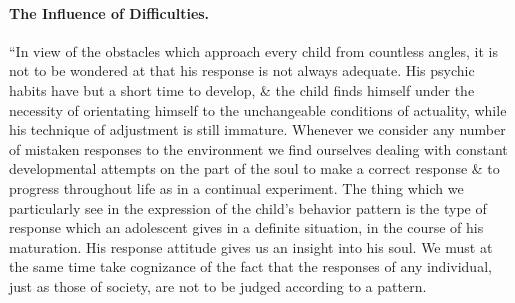 \documentclass{article}
\begin{document}
\paragraph{The Influence of Difficulties.} ``In view of the obstacles which approach every child from countless angles, it is not to be wondered at that his response is not always adequate. His psychic habits have but a short time to develop, \& the child finds himself under the necessity of orientating himself to the unchangeable conditions of actuality, while his technique of adjustment is still immature. Whenever we consider any number of mistaken responses to the environment we find ourselves dealing with constant developmental attempts on the part of the soul to make a correct response \& to progress throughout life as in a continual experiment. The thing which we particularly see in the expression of the child's behavior pattern is the type of response which an adolescent gives in a definite situation, in the course of his maturation. His response attitude gives us an insight into his soul. We must at the same time take cognizance of the fact that the responses of any individual, just as those of society, are not to be judged according to a pattern.
\end{document}
